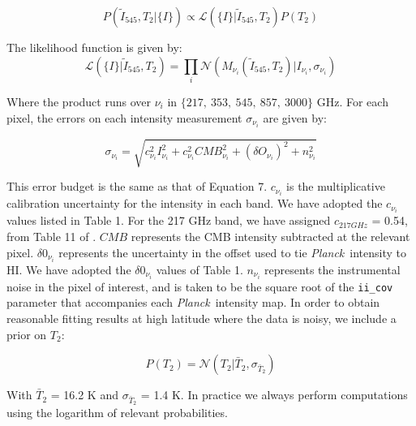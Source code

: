\documentclass{emulateapj}
\newcommand{\PLANCK}{{\it Planck}}
\begin{document}
\begin{equation}
P(\tilde{I}_{545}, T_2|\{I\}) \propto \mathcal{L}(\{I\}|\tilde{I}_{545}, T_2)P(T_2)
\end{equation}

The likelihood function is given by:
\begin{equation}
\mathcal{L}(\{I\}|\tilde{I}_{545}, T_2) = \displaystyle\prod\limits_{i}\mathcal{N}(M_{\nu_{i}}(\tilde{I}_{545}, T_2)|I_{\nu_{i}}, \sigma_{\nu_i})
\end{equation}


Where the product runs over $\nu_i$ in $\{217,\ 353,\ 545,\ 857,\ 3000\}$ GHz. 
For each pixel, the errors on each intensity measurement $\sigma_{\nu_i}$ are 
given by:

\begin{equation}
\sigma_{\nu_i} = \sqrt{c^2_{\nu_i}I^2_{\nu_i} + c^2_{\nu_i}CMB^2_{\nu_i} + (\delta O_{\nu_i})^2 + n^2_{\nu_i}}
\end{equation}

This error budget is the same as that of \cite{planckdust} Equation 7. 
$c_{\nu_i}$ is the multiplicative calibration uncertainty for the intensity in 
each band. We have adopted the $c_{\nu_i}$ values listed in \cite{planckdust} 
Table 1. For the 217 GHz band, we have assigned $c_{217 GHz}$ = 0.54, from 
Table 11 of \cite{planckcalib}. $CMB$ represents the CMB intensity 
subtracted at the relevant pixel. $\delta0_{\nu_i}$ represents the uncertainty
in the offset used to tie \PLANCK~intensity to HI. We have adopted the 
 $\delta0_{\nu_i}$ values of \cite{planckdust} Table 1. $n_{\nu_i}$ represents 
the instrumental noise in the pixel of interest, and is taken to be the square 
root of the \verb|ii_cov| parameter that accompanies each \PLANCK~intensity 
map. In order to obtain reasonable fitting results at high latitude where the 
data is noisy, we include a prior on $T_2$:


\begin{equation}
P(T_2) = \mathcal{N}(T_2|\bar{T}_2, \sigma_{\bar{T}_2})
\end{equation}

With $\bar{T}_2$ = 16.2 K and $\sigma_{\bar{T}_2}$ = 1.4 K. In practice we 
always perform computations using the logarithm of relevant probabilities.
\end{document}
